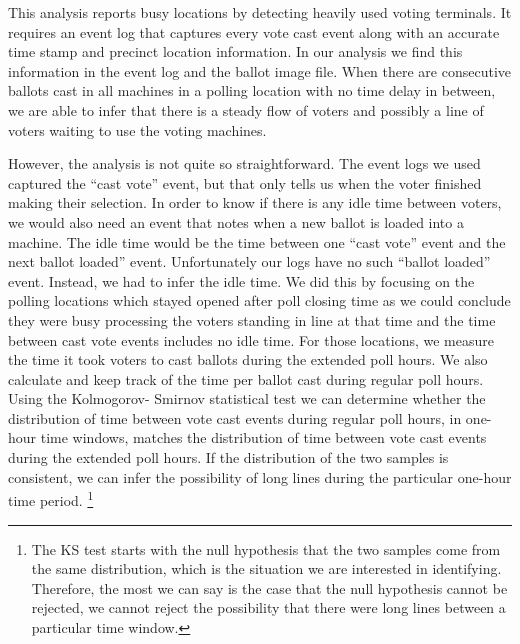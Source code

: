This analysis reports busy locations by detecting heavily used voting terminals. It requires an event log that captures every vote cast event along with an accurate time stamp and precinct location information. In our analysis we find this information in the event log and the ballot image file. When there are consecutive ballots cast in all machines in a polling location with no time delay in between, we are able to infer that there is a steady flow of voters and possibly a line of voters waiting to use the voting machines. 

However, the analysis is not quite so straightforward. The event logs we used captured the \textquotedblleft cast vote'' event, but that only tells us when the voter finished making their selection. In order to know if there is any idle time between voters, we would also need an event that notes when a new ballot is loaded into a machine. The idle time would be the time between one \textquotedblleft cast vote'' event and the next \textquoteblleft ballot loaded'' event. Unfortunately our logs have no such \textquotedblleft ballot loaded'' event. Instead, we had to infer the idle time. We did this by focusing on the polling locations which stayed opened after poll closing time as we could conclude they were busy processing the voters standing in line at that time and the time between cast vote events includes no idle time. For those locations, we measure the time it took voters to cast ballots during the extended poll hours. We also calculate and keep track of the time per ballot cast during regular poll hours. Using the Kolmogorov- Smirnov statistical test we can determine whether the distribution of time between vote cast events during regular poll hours, in one-hour time windows, matches the distribution of time between vote cast events during the extended poll hours. If the distribution of the two samples is consistent, we can infer the possibility of long lines during the particular one-hour time period. \footnote{The KS test starts with the null hypothesis that the two samples come from the same distribution, which is the situation we are interested in identifying. Therefore, the most we can say is the case that the null hypothesis cannot be rejected, we cannot reject the possibility that there were long lines between a particular time window.}
